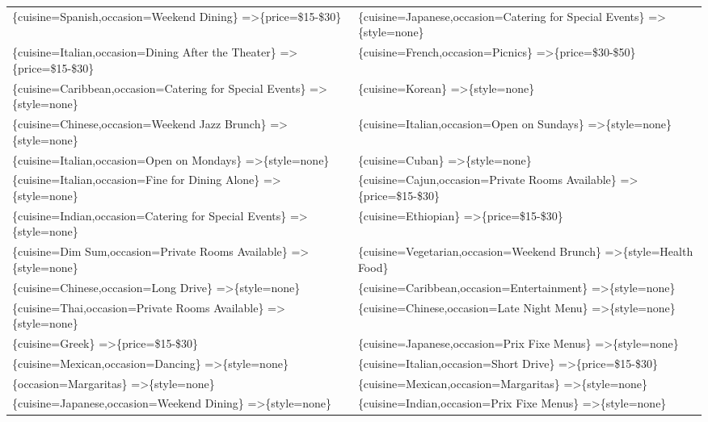 \documentclass[letterpaper,10pt]{article}
\begin{document}
\begin{appendices}
\begin{table}[h]
\begin{adjustbox}{max width=\textwidth}
\begin{tabular}{ll}
\{cuisine=Spanish,occasion=Weekend Dining\} =\textgreater \{price=\$15-\$30\} & \{cuisine=Japanese,occasion=Catering for Special Events\} =\textgreater \{style=none\} \\ 
\{cuisine=Italian,occasion=Dining After the Theater\} =\textgreater \{price=\$15-\$30\} & \{cuisine=French,occasion=Picnics\} =\textgreater \{price=\$30-\$50\} \\ 
\{cuisine=Caribbean,occasion=Catering for Special Events\} =\textgreater \{style=none\} & \{cuisine=Korean\} =\textgreater \{style=none\} \\ 
\{cuisine=Chinese,occasion=Weekend Jazz Brunch\} =\textgreater \{style=none\} & \{cuisine=Italian,occasion=Open on Sundays\} =\textgreater \{style=none\} \\ 
\{cuisine=Italian,occasion=Open on Mondays\} =\textgreater \{style=none\} & \{cuisine=Cuban\} =\textgreater \{style=none\} \\ 
\{cuisine=Italian,occasion=Fine for Dining Alone\} =\textgreater \{style=none\} & \{cuisine=Cajun,occasion=Private Rooms Available\} =\textgreater \{price=\$15-\$30\} \\ 
\{cuisine=Indian,occasion=Catering for Special Events\} =\textgreater \{style=none\} & \{cuisine=Ethiopian\} =\textgreater \{price=\$15-\$30\} \\ 
\{cuisine=Dim Sum,occasion=Private Rooms Available\} =\textgreater \{style=none\} & \{cuisine=Vegetarian,occasion=Weekend Brunch\} =\textgreater \{style=Health Food\} \\ 
\{cuisine=Chinese,occasion=Long Drive\} =\textgreater \{style=none\} & \{cuisine=Caribbean,occasion=Entertainment\} =\textgreater \{style=none\} \\ 
\{cuisine=Thai,occasion=Private Rooms Available\} =\textgreater \{style=none\} & \{cuisine=Chinese,occasion=Late Night Menu\} =\textgreater \{style=none\} \\ 
\{cuisine=Greek\} =\textgreater \{price=\$15-\$30\} & \{cuisine=Japanese,occasion=Prix Fixe Menus\} =\textgreater \{style=none\} \\ 
\{cuisine=Mexican,occasion=Dancing\} =\textgreater \{style=none\} & \{cuisine=Italian,occasion=Short Drive\} =\textgreater \{price=\$15-\$30\} \\ 
\{occasion=Margaritas\} =\textgreater \{style=none\} & \{cuisine=Mexican,occasion=Margaritas\} =\textgreater \{style=none\} \\ 
\{cuisine=Japanese,occasion=Weekend Dining\} =\textgreater \{style=none\} & \{cuisine=Indian,occasion=Prix Fixe Menus\} =\textgreater \{style=none\} \\ 

\end{tabular}
\end{adjustbox}
\end{table}
\end{appendices}
\end{document}
